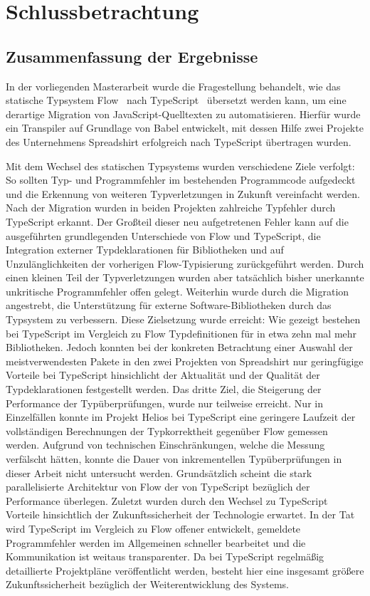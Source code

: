 \chapter{Schlussbetrachtung}
\label{chap:conclusion}

\enlargethispage{\baselineskip}
\section{Zusammenfassung der Ergebnisse}

In der vorliegenden Masterarbeit wurde die Fragestellung behandelt, wie das statische Typsystem Flow~\autocite{FLOW:PAPER} nach TypeScript~\autocite{TYPESCRIPT:SPEC} übersetzt werden kann, um eine derartige Migration von JavaScript-Quelltexten zu automatisieren. Hierfür wurde ein Transpiler auf Grundlage von Babel entwickelt, mit dessen Hilfe zwei Projekte des Unternehmens Spreadshirt erfolgreich nach TypeScript übertragen wurden.

Mit dem Wechsel des statischen Typsystems wurden verschiedene Ziele verfolgt:
So sollten Typ- und Programmfehler im bestehenden Programmcode aufgedeckt und die Erkennung von weiteren Typverletzungen in Zukunft vereinfacht werden. Nach der Migration wurden in beiden Projekten zahlreiche Typfehler durch TypeScript erkannt. Der Großteil dieser neu aufgetretenen Fehler kann auf die ausgeführten grundlegenden Unterschiede von Flow und TypeScript, die Integration externer Typdeklarationen für Bibliotheken und auf Unzulänglichkeiten der vorherigen Flow-Typisierung zurückgeführt werden. Durch einen kleinen Teil der Typverletzungen wurden aber tatsächlich bisher unerkannte unkritische Programmfehler offen gelegt.
Weiterhin wurde durch die Migration angestrebt, die Unterstützung für externe Software-Bibliotheken durch das Typsystem zu verbessern. Diese Zielsetzung wurde erreicht: Wie gezeigt bestehen bei TypeScript im Vergleich zu Flow Typdefinitionen für in etwa zehn mal mehr Bibliotheken. Jedoch konnten bei der konkreten Betrachtung einer Auswahl der meistverwendesten Pakete in den zwei Projekten von Spreadshirt nur geringfügige Vorteile bei TypeScript hinsichlicht der Aktualität und der Qualität der Typdeklarationen festgestellt werden.
Das dritte Ziel, die Steigerung der Performance der Typüberprüfungen, wurde nur teilweise erreicht. Nur in Einzelfällen konnte im Projekt Helios bei TypeScript eine geringere Laufzeit der vollständigen Berechnungen der Typkorrektheit gegenüber Flow gemessen werden. Aufgrund von technischen Einschränkungen, welche die Messung verfälscht hätten, konnte die Dauer von inkrementellen Typüberprüfungen in dieser Arbeit nicht untersucht werden. Grundsätzlich scheint die stark parallelisierte Architektur von Flow der von TypeScript bezüglich der Performance überlegen.
Zuletzt wurden durch den Wechsel zu TypeScript Vorteile hinsichtlich der Zukunftssicherheit der Technologie erwartet. In der Tat wird TypeScript im Vergleich zu Flow offener entwickelt, gemeldete Programmfehler werden im Allgemeinen schneller bearbeitet und die Kommunikation ist weitaus transparenter. Da bei TypeScript regelmäßig detaillierte Projektpläne veröffentlicht werden, besteht hier eine insgesamt größere Zukunftssicherheit bezüglich der Weiterentwicklung des Systems.

